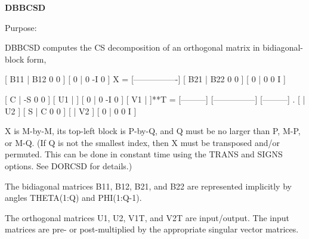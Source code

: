 {\bfseries D\+B\+B\+C\+S\+D} 

 \begin{DoxyParagraph}{Purpose\+: }
\begin{DoxyVerb} DBBCSD computes the CS decomposition of an orthogonal matrix in
 bidiagonal-block form,


     [ B11 | B12 0  0 ]
     [  0  |  0 -I  0 ]
 X = [----------------]
     [ B21 | B22 0  0 ]
     [  0  |  0  0  I ]

                               [  C | -S  0  0 ]
                   [ U1 |    ] [  0 |  0 -I  0 ] [ V1 |    ]**T
                 = [---------] [---------------] [---------]   .
                   [    | U2 ] [  S |  C  0  0 ] [    | V2 ]
                               [  0 |  0  0  I ]

 X is M-by-M, its top-left block is P-by-Q, and Q must be no larger
 than P, M-P, or M-Q. (If Q is not the smallest index, then X must be
 transposed and/or permuted. This can be done in constant time using
 the TRANS and SIGNS options. See DORCSD for details.)

 The bidiagonal matrices B11, B12, B21, and B22 are represented
 implicitly by angles THETA(1:Q) and PHI(1:Q-1).

 The orthogonal matrices U1, U2, V1T, and V2T are input/output.
 The input matrices are pre- or post-multiplied by the appropriate
 singular vector matrices.\end{DoxyVerb}
 
\end{DoxyParagraph}

